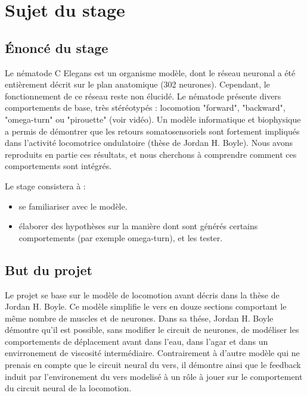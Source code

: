 \chapter{Sujet du stage} %
\label{cha:Sujet du stage}

\section{Énoncé du stage} %
\label{sec:Énoncé du stage}

Le nématode C Elegans est un organisme modèle, dont le réseau neuronal a été entièrement décrit sur le plan
anatomique (302 neurones). Cependant, le fonctionnement de ce réseau reste non élucidé. Le nématode présente
divers comportements de base, très stéréotypés : locomotion "forward", "backward", "omega-turn" ou "pirouette"
(voir vidéo). Un modèle informatique et biophysique a permis de démontrer que les retours somatosensoriels
sont fortement impliqués dans l’activité locomotrice ondulatoire (thèse de Jordan H. Boyle). Nous avons
reproduits en partie ces résultats, et nous cherchons à comprendre comment ces comportements sont intégrés.

Le stage consistera à :
\begin{itemize}
   \item se familiariser avec le modèle.
   \item élaborer des hypothèses sur la manière dont sont générés certains comportements (par exemple
      omega-turn), et les tester.
\end{itemize}


\section{But du projet} %
\label{sec:But du projet}

Le projet se base sur le modèle de locomotion avant décris dans la thèse de Jordan H. Boyle\cite{Boyle2009}.
Ce modèle simplifie le vers en douze sections comportant le même nombre de muscles et de neurones.
Dans sa thése, Jordan H. Boyle démontre qu'il est possible, sans modifier le circuit de neurones, de
modéliser les comportements de déplacement avant dans l'eau, dans l'agar et dans un envirronement
de viscosité intermédiaire. Contrairement à d'autre modèle qui ne prenais en compte que le circuit neural
du vers, il démontre ainsi que le feedback induit par l'environement du vers modelisé à un rôle à jouer sur le
comportement du circuit neural de la locomotion.

